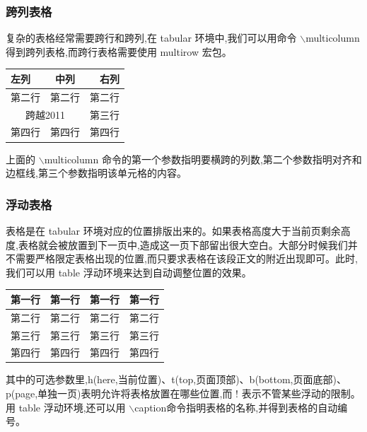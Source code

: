 \documentclass[presentation]{beamer}
\begin{document}
\begin{frame}
  \frametitle{跨列表格}%
复杂的表格经常需要跨行和跨列,在 tabular 环境中,我们可以用命令 $\backslash$multicolumn 得到跨列表格,而跨行表格需要使用 multirow 宏包。
\begin{tabular}{|l|c|r|}
\hline
左列 & 中列 & 右列 \\
\hline
第二行 & 第二行 & 第二行 \\
\hline
\multicolumn{2}{|c|}{跨越2011} & 第三行 \\
\hline
第四行 & 第四行 & 第四行 \\
\hline
\end{tabular}

上面的 $\backslash$multicolumn 命令的第一个参数指明要横跨的列数,第二个参数指明对齐和边框线,第三个参数指明该单元格的内容。

\end{frame}



\begin{frame}
  \frametitle{浮动表格}%
  表格是在 tabular 环境对应的位置排版出来的。如果表格高度大于当前页剩余高度,表格就会被放置到下一页中,造成这一页下部留出很大空白。大部分时候我们并不需要严格限定表格出现的位置,而只要求表格在该段正文的附近出现即可。此时,我们可以用 table 浮动环境来达到自动调整位置的效果。

  \begin{table}[htbp!]
  \centering
  \begin{tabular}{|l|c|r|c|}
    \hline
    第一行 & 第一行 & 第一行 & 第一行 \\
    \hline
    第二行 & 第二行 & 第二行 & 第二行 \\
    \hline
    第三行 & 第三行 & 第三行 & 第三行\\
    \hline
    第四行 & 第四行 & 第四行 & 第四行 \\
    \hline
  \end{tabular}
  \end{table}

其中的可选参数里,h(here,当前位置)、t(top,页面顶部)、b(bottom,页面底部)、p(page,单独一页)表明允许将表格放置在哪些位置,而 ! 表示不管某些浮动的限制。用 table 浮动环境,还可以用 $\backslash$caption命令指明表格的名称,并得到表格的自动编号。

\end{frame}
\end{document}

